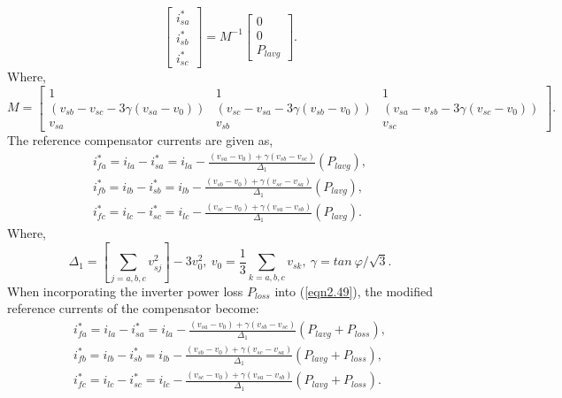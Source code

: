 \begin{equation}
\begin{bmatrix} i^*_{sa} \\  i^*_{sb} \\   i^*_{sc}
 \end{bmatrix}= M^{-1} 
\begin{bmatrix} 0 \\ 0 \\  P_{lavg}
\end{bmatrix}.
\label{eqn2.48}
\end{equation}
Where,
\begin{equation*}
M = {\begin{bmatrix} 1 & 1 & 1 \\ (v_{sb}-v_{sc}-3\gamma (v_{sa}-v_0)) & (v_{sc}-v_{sa}-3\gamma (v_{sb}-v_0)) & (v_{sa}-v_{sb}-3\gamma( v_{sc}-v_0)) \\ v_{sa} & v_{sb} & v_{sc}
\end{bmatrix}}.
\label{eqn2.48a}
\end{equation*}
The reference compensator currents are given as,
\begin{equation}
\begin{split}
i^{*}_{fa} =  i_{la} - i^{*}_{sa} = i_{la}- \frac{(v_{sa}-v_{0})+\gamma(v_{sb}-v_{sc})}{\Delta_1}(P_{lavg}), \\
i^{*}_{fb} =  i_{lb} - i^{*}_{sb} = i_{lb}- \frac{(v_{sb}-v_{0})+\gamma(v_{sc}-v_{sa})}{\Delta_1}(P_{lavg}), \\
i^{*}_{fc} =  i_{lc} - i^{*}_{sc} = i_{lc}- \frac{(v_{sc}-v_{0})+\gamma(v_{sa}-v_{sb})}{\Delta_1}(P_{lavg}).
\end{split}
\label{eqn2.49}
\end{equation}
Where,
\begin{equation}
\Delta_1 = \left[\sum_{j=a,b,c} v^{2}_{sj}\right] - 3 v^2_0, \ v_0 = \frac{1}{3}\sum_{k = a,b,c} v_{sk}, \ \gamma = tan \: \varphi/\sqrt{3}.
\label{eqn2.50}
\end{equation}
When incorporating the inverter power loss $P_{loss}$ into (\ref{eqn2.49}), the modified reference currents of the compensator become:
\begin{equation}
\begin{split}
i^{*}_{fa} =  i_{la} - i^{*}_{sa} = i_{la}- \frac{(v_{sa}-v_0)+\gamma(v_{sb}-v_{sc})}{\Delta_1}(P_{lavg}+P_{loss}), \\
i^{*}_{fb} =  i_{lb} - i^{*}_{sb} = i_{lb}- \frac{(v_{sb}-v_0)+\gamma(v_{sc}-v_{sa})}{\Delta_1}(P_{lavg}+P_{loss}), \\
i^{*}_{fc} =  i_{lc} - i^{*}_{sc} = i_{lc}- \frac{(v_{sc}-v_0)+\gamma(v_{sa}-v_{sb})}{\Delta_1}(P_{lavg}+P_{loss}).
\end{split}
\label{eqn2.51}
\end{equation}
